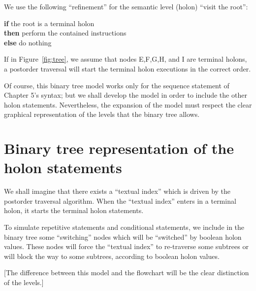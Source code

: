 \documentclass[openany,nobib]{tufte-book}
\newcommand{\kw}[1]{{\bf #1}}
\begin{document}
\medskip

We use the following ``refinement'' for the semantic level (holon) ``visit the
root'':

\medskip

\noindent\-\hspace{0.4cm} \kw{if} the root is a terminal holon\\
\-\hspace{0.7cm} \kw{then} perform the contained instructions\\
\-\hspace{0.7cm} \kw{else} do nothing\\

\medskip

If in Figure~\ref{fig:tree}, we assume that nodes E,F,G,H, and I are terminal
holons, a postorder traversal will start the terminal holon executions in the
correct order.

Of course, this binary tree model works only for the sequence statement of
Chapter 5's syntax; but we shall develop the model in order to include the
other holon statements.
Nevertheless, the expansion of the model must respect the clear graphical
representation of the levels that the binary tree allows.

\section{Binary tree representation of the holon statements}


\noindent We shall imagine that there exists a ``textual
index''\autocite{dijkstra1968letters} which is driven by the postorder
traversal algorithm. When the ``textual index'' enters in a terminal holon, it
starts the terminal holon statements.

To simulate repetitive statements and conditional statements, we include in the
binary tree some ``switching'' nodes which will be ``switched'' by boolean
holon values. These nodes will force the ``textual index'' to re-traverse some
subtrees or will block the way to some subtrees, according to boolean holon
values.

[The difference between this model and the flowchart will be the clear
distinction of the levels.]
\end{document}
